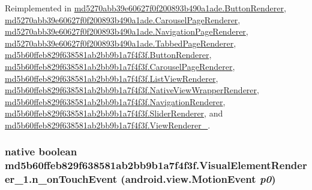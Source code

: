 Reimplemented in \hyperlink{classmd5270abb39e60627f0f200893b490a1ade_1_1_button_renderer_fd8f463e834eac0c0aa3ec80c6a310bc}{md5270abb39e60627f0f200893b490a1ade.ButtonRenderer}, \hyperlink{classmd5270abb39e60627f0f200893b490a1ade_1_1_carousel_page_renderer_20a089cd60211dba7bd4767bee115a9e}{md5270abb39e60627f0f200893b490a1ade.CarouselPageRenderer}, \hyperlink{classmd5270abb39e60627f0f200893b490a1ade_1_1_navigation_page_renderer_cf8eee3954579f5da6d0ced3acc03357}{md5270abb39e60627f0f200893b490a1ade.NavigationPageRenderer}, \hyperlink{classmd5270abb39e60627f0f200893b490a1ade_1_1_tabbed_page_renderer_4fb0dec5bc638178fcee3690897ce067}{md5270abb39e60627f0f200893b490a1ade.TabbedPageRenderer}, \hyperlink{classmd5b60ffeb829f638581ab2bb9b1a7f4f3f_1_1_button_renderer_3d85bf7ad5f9368589a177164ef752bd}{md5b60ffeb829f638581ab2bb9b1a7f4f3f.ButtonRenderer}, \hyperlink{classmd5b60ffeb829f638581ab2bb9b1a7f4f3f_1_1_carousel_page_renderer_2efb0f1874a6cb3040c950ab5e63022a}{md5b60ffeb829f638581ab2bb9b1a7f4f3f.CarouselPageRenderer}, \hyperlink{classmd5b60ffeb829f638581ab2bb9b1a7f4f3f_1_1_list_view_renderer_88db0ee991444107111a9da6f510dfc5}{md5b60ffeb829f638581ab2bb9b1a7f4f3f.ListViewRenderer}, \hyperlink{classmd5b60ffeb829f638581ab2bb9b1a7f4f3f_1_1_native_view_wrapper_renderer_7b65d0e1278ae3edf756f1f5dccf72fa}{md5b60ffeb829f638581ab2bb9b1a7f4f3f.NativeViewWrapperRenderer}, \hyperlink{classmd5b60ffeb829f638581ab2bb9b1a7f4f3f_1_1_navigation_renderer_af33a2356cdc5ae5ab47a5c443433d3b}{md5b60ffeb829f638581ab2bb9b1a7f4f3f.NavigationRenderer}, \hyperlink{classmd5b60ffeb829f638581ab2bb9b1a7f4f3f_1_1_slider_renderer_77b7da7854dd07e25a132e99b1f712ad}{md5b60ffeb829f638581ab2bb9b1a7f4f3f.SliderRenderer}, and \hyperlink{classmd5b60ffeb829f638581ab2bb9b1a7f4f3f_1_1_view_renderer__2_40c528ea52e22dd29fa541de43c0a010}{md5b60ffeb829f638581ab2bb9b1a7f4f3f.ViewRenderer\_}.\hypertarget{classmd5b60ffeb829f638581ab2bb9b1a7f4f3f_1_1_visual_element_renderer__1_bf46ffd446313b87383a085a60d65dd4}{
\subsubsection[{n\_\-onTouchEvent}]{\setlength{\rightskip}{0pt plus 5cm}native boolean md5b60ffeb829f638581ab2bb9b1a7f4f3f.VisualElementRenderer\_\-1.n\_\-onTouchEvent (android.view.MotionEvent {\em p0})}}
\label{classmd5b60ffeb829f638581ab2bb9b1a7f4f3f_1_1_visual_element_renderer__1_bf46ffd446313b87383a085a60d65dd4}




